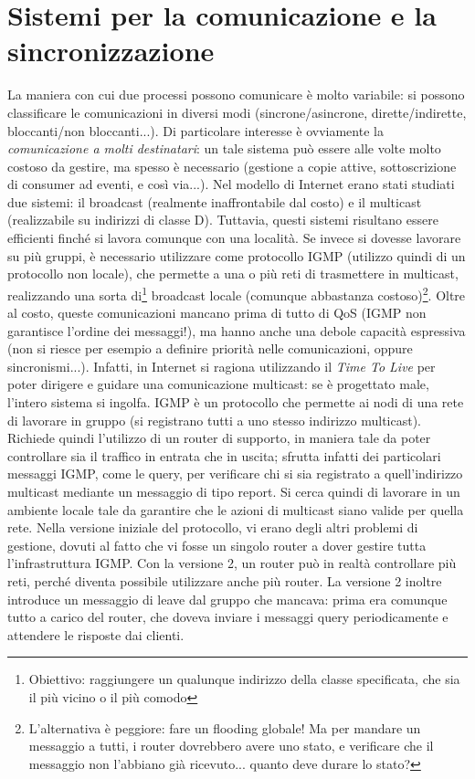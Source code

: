 \section{Sistemi per la comunicazione e la sincronizzazione}
La maniera con cui due processi possono comunicare è molto variabile: si possono classificare le comunicazioni in
diversi modi (sincrone/asincrone, dirette/indirette, bloccanti/non bloccanti...). Di particolare interesse è
ovviamente la \textit{comunicazione a molti destinatari}: un tale sistema può essere alle volte molto costoso da
gestire, ma spesso è necessario (gestione a copie attive, sottoscrizione di consumer ad eventi, e così via...).
Nel modello di Internet erano stati studiati due sistemi: il broadcast (realmente inaffrontabile dal costo) e
il multicast (realizzabile su indirizzi di classe D). Tuttavia, questi sistemi risultano essere efficienti finché si
lavora comunque con una località. Se invece si dovesse lavorare su più gruppi, è necessario utilizzare come protocollo
IGMP (utilizzo quindi di un protocollo non locale), che permette a una o più reti di trasmettere in multicast,
realizzando una sorta di\footnote{Obiettivo: raggiungere un qualunque indirizzo della classe specificata, che sia il più
vicino o il più comodo} broadcast locale (comunque abbastanza costoso)\footnote{L'alternativa è peggiore: fare un
flooding globale! Ma per mandare un messaggio a tutti, i router dovrebbero avere uno stato, e verificare che il messaggio
non l'abbiano già ricevuto... quanto deve durare lo stato?}. Oltre al costo, queste comunicazioni mancano prima di
tutto di QoS (IGMP non garantisce l'ordine dei messaggi!), ma hanno anche una debole capacità espressiva (non si riesce
per esempio a definire priorità nelle comunicazioni, oppure sincronismi...). Infatti, in Internet si ragiona utilizzando
il \textit{Time To Live} per poter dirigere e guidare una comunicazione multicast: se è progettato male, l'intero
sistema si ingolfa.
IGMP è un protocollo che permette ai nodi di una rete di lavorare in gruppo (si registrano tutti a uno stesso indirizzo
multicast). Richiede quindi l'utilizzo di un router di supporto, in maniera tale da poter controllare sia il traffico in
entrata che in uscita; sfrutta infatti dei particolari messaggi IGMP, come le query, per verificare chi si sia registrato
a quell'indirizzo multicast mediante un messaggio di tipo report. Si cerca quindi di lavorare in un ambiente locale tale
da garantire che le azioni di multicast siano valide per quella rete.
Nella versione iniziale del protocollo, vi erano degli altri problemi di gestione, dovuti al fatto che vi fosse un
singolo router a dover gestire tutta l'infrastruttura IGMP. Con la versione 2, un router può in realtà controllare più
reti, perché diventa possibile utilizzare anche più router. La versione 2 inoltre introduce un messaggio di leave dal
gruppo che mancava: prima era comunque tutto a carico del router, che doveva inviare i messaggi query periodicamente
e attendere le risposte dai clienti.
